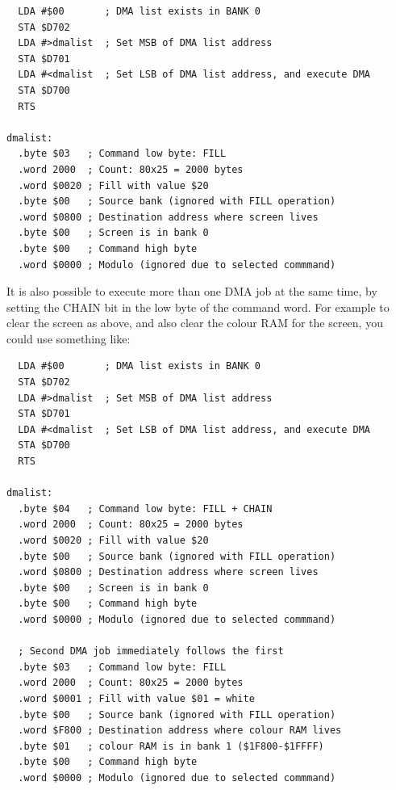 \begin{tcolorbox}[colback=black,coltext=white]
\verbatimfont{\codefont}
\begin{verbatim}
  LDA #$00       ; DMA list exists in BANK 0
  STA $D702
  LDA #>dmalist  ; Set MSB of DMA list address
  STA $D701
  LDA #<dmalist  ; Set LSB of DMA list address, and execute DMA
  STA $D700
  RTS

dmalist:
  .byte $03   ; Command low byte: FILL
  .word 2000  ; Count: 80x25 = 2000 bytes
  .word $0020 ; Fill with value $20
  .byte $00   ; Source bank (ignored with FILL operation)
  .word $0800 ; Destination address where screen lives
  .byte $00   ; Screen is in bank 0
  .byte $00   ; Command high byte
  .word $0000 ; Modulo (ignored due to selected commmand)
\end{verbatim}
\end{tcolorbox}

It is also possible to execute more than one DMA job at the same time, by setting the CHAIN
bit in the low byte of the command word. For example to clear the screen as above, and
also clear the colour RAM for the screen, you could use something like:

\begin{tcolorbox}[colback=black,coltext=white]
\verbatimfont{\codefont}
\begin{verbatim}
  LDA #$00       ; DMA list exists in BANK 0
  STA $D702
  LDA #>dmalist  ; Set MSB of DMA list address
  STA $D701
  LDA #<dmalist  ; Set LSB of DMA list address, and execute DMA
  STA $D700
  RTS

dmalist:
  .byte $04   ; Command low byte: FILL + CHAIN
  .word 2000  ; Count: 80x25 = 2000 bytes
  .word $0020 ; Fill with value $20
  .byte $00   ; Source bank (ignored with FILL operation)
  .word $0800 ; Destination address where screen lives
  .byte $00   ; Screen is in bank 0
  .byte $00   ; Command high byte
  .word $0000 ; Modulo (ignored due to selected commmand)

  ; Second DMA job immediately follows the first
  .byte $03   ; Command low byte: FILL
  .word 2000  ; Count: 80x25 = 2000 bytes
  .word $0001 ; Fill with value $01 = white
  .byte $00   ; Source bank (ignored with FILL operation)
  .word $F800 ; Destination address where colour RAM lives
  .byte $01   ; colour RAM is in bank 1 ($1F800-$1FFFF)
  .byte $00   ; Command high byte
  .word $0000 ; Modulo (ignored due to selected commmand)
\end{verbatim}
\end{tcolorbox}

